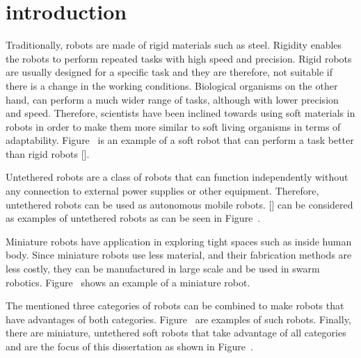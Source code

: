 \graphicspath{{Images/intro/}}
\chapter{introduction}
\label{chap:intro}

Traditionally, robots are made of rigid materials such as steel. Rigidity enables the robots to perform repeated tasks with high speed and precision. Rigid robots are usually designed for a specific task and they are therefore, not suitable if there is a change in the working conditions. Biological organisms on the other hand, can perform a much wider range of tasks, although with lower precision and speed. Therefore, scientists have been inclined towards using soft materials in robots in order to make them more similar to soft living organisms in terms of adaptability. Figure~ is an example of a soft robot that can perform a task better than rigid robots [].

Untethered robots are a class of robots that can function independently without any connection to external power supplies or other equipment. Therefore, untethered robots can be used as autonomous mobile robots. [] can be considered as examples of untethered robots as can be seen in Figure~. 

Miniature robots have application in exploring tight spaces such as inside human body. Since miniature robots use less material, and their fabrication methods are less costly, they can be manufactured in large scale and be used in swarm robotics. Figure~ shows an example of a miniature robot. 

The mentioned three categories of robots can be combined to make robots that have advantages of both categories. Figure~ are examples of such robots. Finally, there are miniature, untethered soft robots that take advantage of all categories and are the focus of this dissertation as shown in Figure~.


